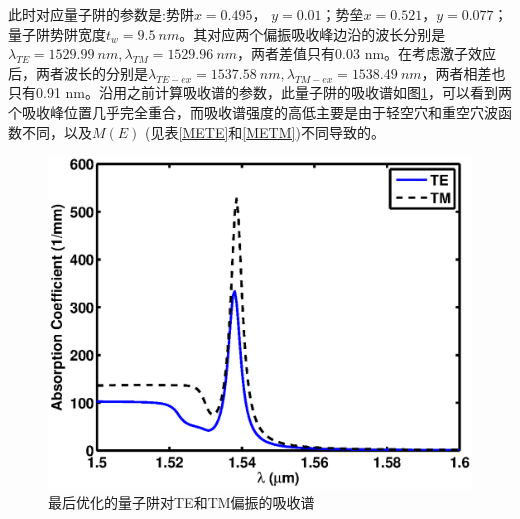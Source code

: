 此时对应量子阱的参数是:势阱$x = 0.495$， $y  = 0.01$；势垒$x = 0.521$，$y = 0.077$；量子阱势阱宽度$t_w = 9.5~nm$。其对应两个偏振吸收峰边沿的波长分别是$ \lambda_{TE} =1529.99~ nm, \lambda_{TM} =  1529.96 ~nm$，两者差值只有0.03 nm。在考虑激子效应后，两者波长的分别是$ \lambda_{TE-ex} =1537.58~ nm, \lambda_{TM-ex} =  1538.49~ nm$，两者相差也只有0.91 nm。沿用之前计算吸收谱的参数，此量子阱的吸收谱如图\ref{fig_ch2_opt_abs_tetm}，可以看到两个吸收峰位置几乎完全重合，而吸收谱强度的高低主要是由于轻空穴和重空穴波函数不同，以及$M(E)$ (见表\ref{METE}和\ref{METM})不同导致的。
\begin{figure}[htb]
	\centering
	\includegraphics[width=12cm]{./Pictures/fig_ch2_opt_abs_tetm.eps}
	\caption{最后优化的量子阱对TE和TM偏振的吸收谱}
	\label{fig_ch2_opt_abs_tetm}
\end{figure}


